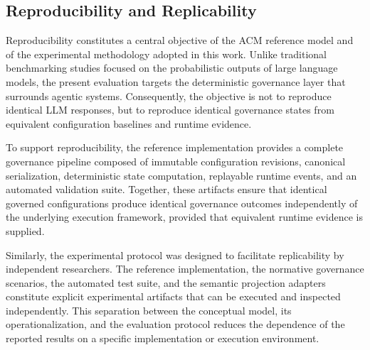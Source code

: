 \documentclass[10pt]{article}
\begin{document}
\subsection{Reproducibility and Replicability}
\label{sec:reproducibility}

Reproducibility constitutes a central objective of the ACM reference model and of the experimental methodology adopted in this work. Unlike traditional benchmarking studies focused on the probabilistic outputs of large language models, the present evaluation targets the deterministic governance layer that surrounds agentic systems. Consequently, the objective is not to reproduce identical LLM responses, but to reproduce identical governance states from equivalent configuration baselines and runtime evidence.

To support reproducibility, the reference implementation provides a complete governance pipeline composed of immutable configuration revisions, canonical serialization, deterministic state computation, replayable runtime events, and an automated validation suite. Together, these artifacts ensure that identical governed configurations produce identical governance outcomes independently of the underlying execution framework, provided that equivalent runtime evidence is supplied.

Similarly, the experimental protocol was designed to facilitate replicability by independent researchers. The reference implementation, the normative governance scenarios, the automated test suite, and the semantic projection adapters constitute explicit experimental artifacts that can be executed and inspected independently. This separation between the conceptual model, its operationalization, and the evaluation protocol reduces the dependence of the reported results on a specific implementation or execution environment.
\end{document}
